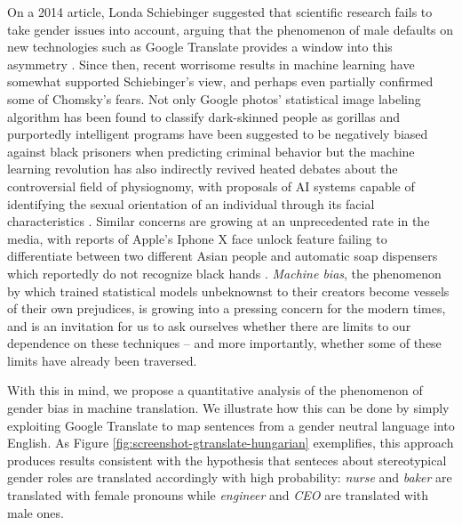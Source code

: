 \documentclass[jair,twoside,11pt,theapa]{article}
\begin{document}
On a 2014 article, Londa Schiebinger suggested that scientific research fails to take gender issues into account, arguing that the phenomenon of male defaults on new technologies such as Google Translate provides a window into this asymmetry \cite{schiebinger2014scientific}. Since then, recent worrisome results in machine learning have somewhat supported Schiebinger's view, and perhaps even partially confirmed some of Chomsky's fears. Not only Google photos' statistical image labeling algorithm has been found to classify dark-skinned people as gorillas \cite{garcia2016racist} and purportedly intelligent programs have been suggested to be negatively biased against black prisoners when predicting criminal behavior \cite{angwin2016machine} but the machine learning revolution has also indirectly revived heated debates about the controversial field of physiognomy, with proposals of AI systems capable of identifying the sexual orientation of an individual through its facial characteristics \cite{wang2017deep}. Similar concerns are growing at an unprecedented rate in the media, with reports of Apple's Iphone X face unlock feature failing to differentiate between two different Asian people \cite{womanunlockphone2017} and automatic soap dispensers which reportedly do not recognize black hands \cite{racistsoapdispenser2017}. \emph{Machine bias}, the phenomenon by which trained statistical models unbeknownst to their creators become vessels of their own prejudices, is growing into a pressing concern for the modern times, and is an invitation for us to ask ourselves whether there are limits to our dependence on these techniques -- and more importantly, whether some of these limits have already been traversed.

With this in mind, we propose a quantitative analysis of the phenomenon of gender bias in machine translation. We illustrate how this can be done by simply exploiting Google Translate to map sentences from a gender neutral language into English. As Figure \ref{fig:screenshot-gtranslate-hungarian} exemplifies, this approach produces results consistent with the hypothesis that senteces about stereotypical gender roles are translated accordingly with high probability: \emph{nurse} and \emph{baker} are translated with female pronouns while \emph{engineer} and \emph{CEO} are translated with male ones.
\end{document}
